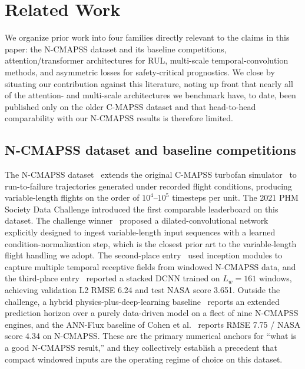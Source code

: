 \section{Related Work}

We organize prior work into four families directly relevant to the claims in this paper: the N-CMAPSS dataset and its baseline competitions, attention/transformer architectures for RUL, multi-scale temporal-convolution methods, and asymmetric losses for safety-critical prognostics. We close by situating our contribution against this literature, noting up front that nearly all of the attention- and multi-scale architectures we benchmark have, to date, been published only on the older C-MAPSS dataset and that head-to-head comparability with our N-CMAPSS results is therefore limited.

\subsection{N-CMAPSS dataset and baseline competitions}

The N-CMAPSS dataset~\cite{ariaschao2021ncmapss} extends the original C-MAPSS turbofan simulator~\cite{saxena2008damage} to run-to-failure trajectories generated under recorded flight conditions, producing variable-length flights on the order of $10^{4}$--$10^{5}$ timesteps per unit. The 2021 PHM Society Data Challenge introduced the first comparable leaderboard on this dataset. The challenge winner~\cite{lovberg2021variable} proposed a dilated-convolutional network explicitly designed to ingest variable-length input sequences with a learned condition-normalization step, which is the closest prior art to the variable-length flight handling we adopt. The second-place entry~\cite{devol2021inception} used inception modules to capture multiple temporal receptive fields from windowed N-CMAPSS data, and the third-place entry~\cite{solismartin2021stacked} reported a stacked DCNN trained on $L_w = 161$ windows, achieving validation L2 RMSE 6.24 and test NASA score 3.651. Outside the challenge, a hybrid physics-plus-deep-learning baseline~\cite{ariaschao2022fusing} reports an extended prediction horizon over a purely data-driven model on a fleet of nine N-CMAPSS engines, and the ANN-Flux baseline of Cohen et al.~\cite{ncmapss_eventual2023} reports RMSE 7.75 / NASA score 4.34 on N-CMAPSS. These are the primary numerical anchors for ``what is a good N-CMAPSS result,'' and they collectively establish a precedent that compact windowed inputs are the operating regime of choice on this dataset.

